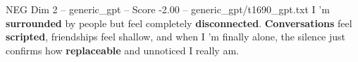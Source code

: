 \begin{textsample}{NEG Dim 2 – generic\_gpt – Score -2.00 – generic\_gpt/t1690\_gpt.txt}  \label{ex:f2_neg_019}
I ’m \textbf{surrounded} by people but feel completely \textbf{disconnected}. \textbf{Conversations} feel \textbf{scripted}, friendships feel shallow, and when I ’m finally alone, the silence just confirms how \textbf{replaceable} and unnoticed I really am.

\end{textsample}

